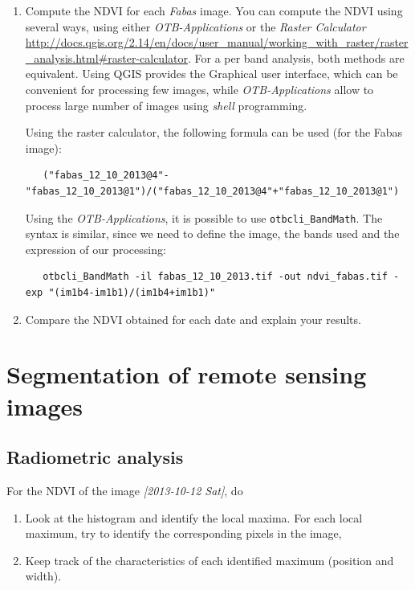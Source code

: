 \documentclass[a4paper,11pt,DIV=18]{scrartcl}
\begin{document}
\begin{work}
\begin{enumerate}
\item Compute  the NDVI for each  \emph{Fabas} image.  You can  compute the NDVI
using several  ways, using  either \emph{OTB-Applications} or  the \emph{Raster
Calculator}
\url{http://docs.qgis.org/2.14/en/docs/user\_manual/working\_with\_raster/raster\_analysis.html\#raster-calculator}.
For a per  band analysis, both methods are  equivalent.  Using QGIS
provides the Graphical user interface,  which can be convenient for
processing  few images,  while  \emph{OTB-Applications}  allow to  process
large number of images using \emph{shell} programming.

Using the raster calculator, the following formula can be used (for
the Fabas image):

\begin{verbatim}
   ("fabas_12_10_2013@4"-"fabas_12_10_2013@1")/("fabas_12_10_2013@4"+"fabas_12_10_2013@1")
\end{verbatim}

Using    the   \emph{OTB-Applications},    it   is    possible   to    use
\texttt{otbcli\_BandMath}. The syntax is similar, since we need to define the
image, the bands used and the expression of our processing:

\begin{verbatim}
   otbcli_BandMath -il fabas_12_10_2013.tif -out ndvi_fabas.tif -exp "(im1b4-im1b1)/(im1b4+im1b1)"   
\end{verbatim}

\item Compare the NDVI obtained for each date and explain your results.
\end{enumerate}
\end{work}
\section{Segmentation of remote sensing images}
\label{sec:org0f185be}
\subsection{Radiometric analysis}
\label{sec:orga2fef5c}
\begin{work}
For the NDVI of the image \textit{[2013-10-12 Sat]}, do
\begin{enumerate}
\item Look  at the  histogram and  identify the  local maxima.   For each
local  maximum, try  to identify  the corresponding  pixels in  the
image,
\item Keep track  of  the characteristics  of  each identified  maximum
(position and width).
\end{enumerate}
\end{work}
\end{document}
